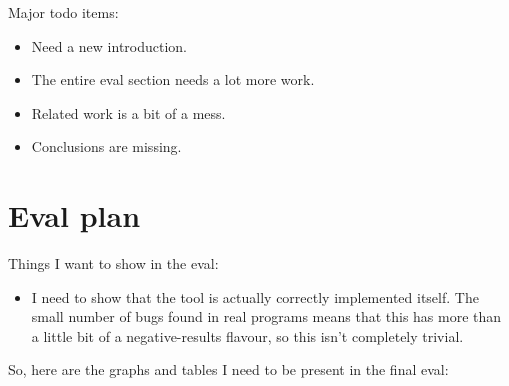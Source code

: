 Major todo items:

\begin{itemize}
\item Need a new introduction.
\item The entire eval section needs a lot more work.
\item Related work is a bit of a mess.
\item Conclusions are missing.
\end{itemize}


\section{Eval plan}

Things I want to show in the eval:

\begin{itemize}
\item I need to show that the tool is actually correctly implemented
  itself.  The small number of bugs found in real programs means that
  this has more than a little bit of a negative-results flavour, so
  this isn't completely trivial.
\end{itemize}

So, here are the graphs and tables I need to be present in the final
eval:

